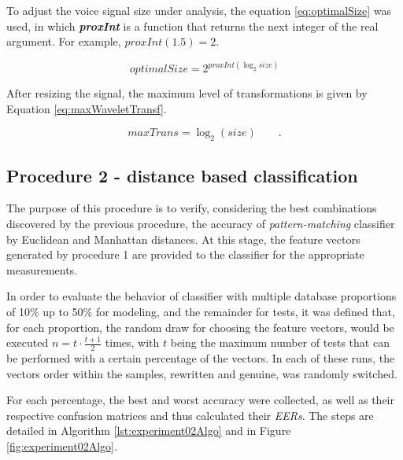 			\par To adjust the voice signal size under analysis, the equation \ref{eq:optimalSize} was used, in which \textit{\textbf{proxInt}} is a function that returns the next integer of the real argument. For example, $proxInt(1.5)=2$.

			\begin{equation}
				optimalSize=2^{proxInt(\log_{2}size)}
				\label{eq:optimalSize}
			\end{equation} 
			
			\par After resizing the signal, the maximum level of transformations is given by Equation \ref{eq:maxWaveletTransf}. 
			
			\begin{equation}
				maxTrans=\log_{2}(size) \qquad.
				\label{eq:maxWaveletTransf}
			\end{equation}
			
		\subsection{Procedure 2 - distance based classification}
			\label{sec:propApproach:subsec:Experiment2}
			\par The purpose of this procedure is to verify, considering the best combinations discovered by the previous procedure, the accuracy of \textit{pattern-matching} classifier by Euclidean and Manhattan distances. At this stage, the feature vectors generated by procedure 1 are provided to the classifier for the appropriate measurements.
			
			\par In order to evaluate the behavior of classifier with multiple database proportions of 10\% up to 50\% for modeling, and the remainder for tests, it was defined that, for each proportion, the random draw for choosing the feature vectors, would be executed $n=t\cdot\frac{t+1}{2}$ times, with $t$ being the maximum number of tests that can be performed with a certain percentage of the vectors. In each of these runs, the vectors order within the samples, rewritten and genuine, was randomly switched.
			
			\par For each percentage, the best and worst accuracy were collected, as well as their respective confusion matrices and thus calculated their \textit{EERs}. The steps are detailed in Algorithm \ref{lst:experiment02Algo} and in Figure \ref{fig:experiment02Algo}.
	
